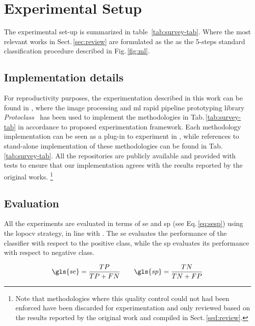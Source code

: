 \graphicspath{ {./content/method/figures/} }

\section{Experimental Setup}\label{sec:exp}

The experimental set-up is summarized in table~\ref{tab:survey-tab}.
Where the most relevant works in Sect.\,\ref{sec:review} are formulated as the as the 5-steps standard classification procedure described in Fig.\,\ref{fig:ml}.



\subsection{Implementation details}\label{sec:exp:implementation}
For reproductivity purposes, the experimentation described in this work can be found in \cite{EXPERIMENT_REPO},
where the image processing and \gls{ml} rapid pipeline prototyping library \emph{Protoclass}~\cite{PROTOCLASS_REPO} has been used to implement the methodologies in Tab.\,\ref{tab:survey-tab} in accordance to proposed experimentation framework.
Each methodology implementation can be seen as a plug-in to experiment in \cite{EXPERIMENT_REPO}, while references to stand-alone implementation of these methodologies can be found in Tab.\,\ref{tab:survey-tab}.
All the repositories are publicly available and provided with tests to ensure that our implementation agrees with the results reported by the original works.
\footnote{Note that methodologies where this quality control could not had been enforced have been discarded for experimentation and only reviewed based on the results reported by the original work and compiled in Sect.\,\ref{sed:review}.}

\subsection{Evaluation}\label{sec:exp:evaluation}
All the experiments are evaluated in terms of \gls{se} and \gls{sp} (see Eq.\,\ref{eq:sesp}) using the \gls{lopocv} strategy, in line with \cite{Lemaintre2015miccaiOCT}.
The \gls{se} evaluates the performance of the classifier with respect to the positive class, while the \gls{sp} evaluates its performance with respect to negative class.

\begin{align}
 \gls{se}  = \frac{TP}{TP+FN} \qquad \gls{sp} = \frac{TN}{TN+FP}
 \label{eq:sesp}
\end{align}

